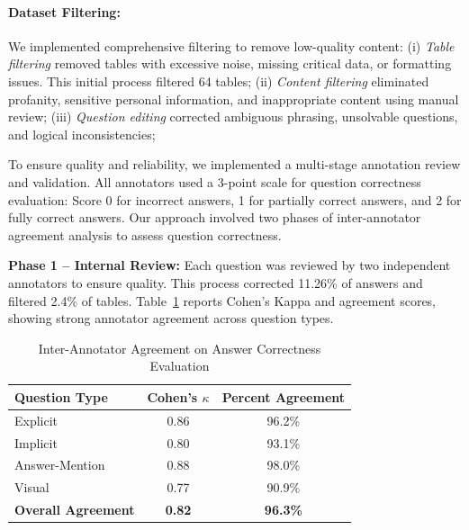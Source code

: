 \documentclass[11pt]{article}
\begin{document}
\paragraph{Dataset Filtering:} We implemented comprehensive filtering to remove low-quality content: (i) \textit{Table filtering} removed tables with excessive noise, missing critical data, or formatting issues. This initial process filtered 64 tables; (ii) \textit{Content filtering} eliminated profanity, sensitive personal information, and inappropriate content using manual review; (iii) \textit{Question editing} corrected ambiguous phrasing, unsolvable questions, and logical inconsistencies;

To ensure quality and reliability, we implemented a multi-stage annotation review and validation. All annotators used a 3-point scale for question correctness evaluation: Score 0 for incorrect answers, 1 for partially correct answers, and 2 for fully correct answers. Our approach involved two phases of inter-annotator agreement analysis to assess question correctness.

\noindent \textbf{Phase 1 – Internal Review:} Each question was reviewed by two independent annotators to ensure quality. This process corrected 11.26\% of answers and filtered 2.4\% of tables. Table~\ref{tab:answer_agreement} reports Cohen’s Kappa and agreement scores, showing strong annotator agreement across question types.
\begin{table}[htbp]
\vspace{-0.5em}
\centering
\small
\setlength{\aboverulesep}{0pt}
\setlength{\belowrulesep}{0pt}
\setlength{\tabcolsep}{5pt}
\begin{tabular}{lcc}
\toprule
\textbf{Question Type} & \textbf{Cohen's $\kappa$} & \textbf{Percent Agreement} \\
\midrule
Explicit & 0.86 & 96.2\% \\
Implicit & 0.80 & 93.1\% \\
Answer-Mention & 0.88 & 98.0\% \\
Visual & 0.77 & 90.9\% \\
\midrule
\rowcolor{yellow!20}\textbf{Overall Agreement} & \textbf{0.82} & \textbf{96.3\%} \\
\bottomrule
\end{tabular}
\vspace{-0.5em}
\caption{\small Inter-Annotator Agreement on Answer Correctness Evaluation}
\label{tab:answer_agreement}
\vspace{-1.0em}
\end{table}
\end{document}
